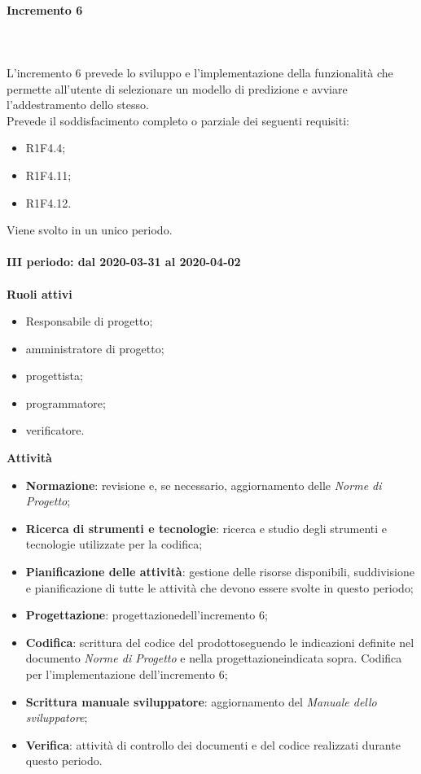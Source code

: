 \paragraph{Incremento 6} \mbox{} \\ \\
L'incremento 6 prevede lo sviluppo e l'implementazione della funzionalità che permette all'utente di selezionare un modello di predizione e avviare l'addestramento dello stesso.
\\Prevede il soddisfacimento completo o parziale dei seguenti requisiti:
\begin{itemize}
	\item R1F4.4;
	\item R1F4.11;
	\item R1F4.12.
\end{itemize}
Viene svolto in un unico periodo.
\mbox{} \\ \\ \textbf{III periodo: dal 2020-03-31 al 2020-04-02} \mbox{} \\ \\
\textbf{Ruoli attivi}
\begin{itemize}
	\item Responsabile di progetto\glo;
	\item amministratore di progetto\glo;
	\item progettista;
	\item programmatore;
	\item verificatore.
\end{itemize}
\textbf{Attività} 
\begin{itemize}
	\item \textbf{Normazione}: revisione e, se necessario, aggiornamento delle \textit{Norme di Progetto};
	\item \textbf{Ricerca di strumenti e tecnologie}: ricerca e studio degli strumenti e tecnologie utilizzate per la codifica;
	\item \textbf{Pianificazione delle attività}: gestione delle risorse disponibili, suddivisione e pianificazione di tutte le attività che devono essere svolte in questo periodo;
	\item \textbf{Progettazione}\glo: progettazione\glosp dell'incremento 6;  
	\item \textbf{Codifica}: scrittura del codice del prodotto\glosp seguendo le indicazioni definite nel documento \textit{Norme di Progetto} e nella progettazione\glosp indicata sopra. Codifica per l'implementazione dell'incremento 6;
	\item \textbf{Scrittura manuale sviluppatore}: aggiornamento del \textit{Manuale dello sviluppatore};
	\item \textbf{Verifica}: attività di controllo dei documenti e del codice realizzati durante questo periodo.
\end{itemize}
